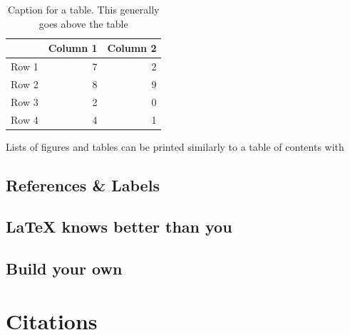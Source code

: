 \documentclass{article}
\begin{document}
\begin{table}
    \centering
    \caption{Caption for a table. This generally goes above the table}
    \begin{tabular}{lrr}
      \toprule
      & Column 1 & Column 2 \\
      \midrule
      Row 1 & 7 & 2 \\
      Row 2 & 8 & 9 \\
      Row 3 & 2 & 0 \\
      Row 4 & 4 & 1 \\
      \bottomrule
    \end{tabular}
\end{table}

Lists of figures and tables can be printed similarly to a table of contents with 

\listoffigures
\listoftables

\subsection{References \& Labels}


\subsection{\LaTeX{} knows better than you}


\subsection{Build your own}


\section{Citations}


\printbibliography
\end{document}
